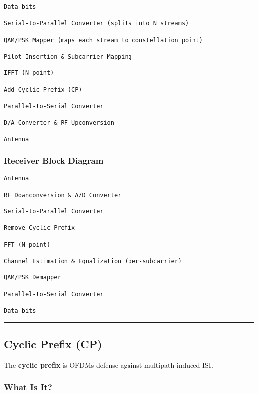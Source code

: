 \begin{verbatim}
Data bits
   
Serial-to-Parallel Converter (splits into N streams)
   
QAM/PSK Mapper (maps each stream to constellation point)
   
Pilot Insertion & Subcarrier Mapping
   
IFFT (N-point)
   
Add Cyclic Prefix (CP)
   
Parallel-to-Serial Converter
   
D/A Converter & RF Upconversion
   
Antenna
\end{verbatim}

\subsubsection{Receiver Block Diagram}\label{receiver-block-diagram}

\begin{verbatim}
Antenna
   
RF Downconversion & A/D Converter
   
Serial-to-Parallel Converter
   
Remove Cyclic Prefix
   
FFT (N-point)
   
Channel Estimation & Equalization (per-subcarrier)
   
QAM/PSK Demapper
   
Parallel-to-Serial Converter
   
Data bits
\end{verbatim}

\begin{center}\rule{0.5\linewidth}{0.5pt}\end{center}

\subsection{\texorpdfstring{ Cyclic Prefix
(CP)}{ Cyclic Prefix (CP)}}\label{cyclic-prefix-cp}

The \textbf{cyclic prefix} is OFDM\textquotesingle s defense against
multipath-induced ISI.

\subsubsection{What Is It?}\label{what-is-it}

